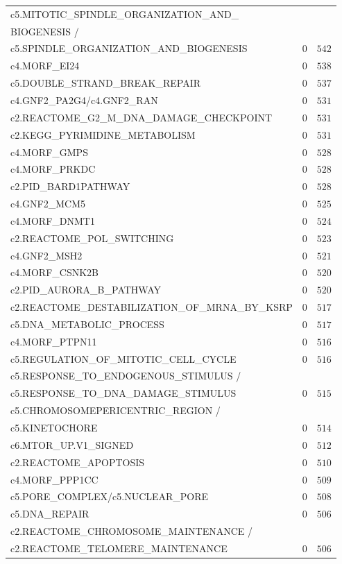 \begin{longtable}[!htbp]{ l r@{.}l }
c5.MITOTIC\_SPINDLE\_ORGANIZATION\_AND\_ \\
\qquad BIOGENESIS / \\
\qquad c5.SPINDLE\_ORGANIZATION\_AND\_BIOGENESIS & $0$ & $542$ \\
c4.MORF\_EI24 & $0$ & $538$ \\
c5.DOUBLE\_STRAND\_BREAK\_REPAIR & $0$ & $537$ \\
c4.GNF2\_PA2G4/c4.GNF2\_RAN & $0$ & $531$ \\
c2.REACTOME\_G2\_M\_DNA\_DAMAGE\_CHECKPOINT & $0$ & $531$ \\
c2.KEGG\_PYRIMIDINE\_METABOLISM & $0$ & $531$ \\
c4.MORF\_GMPS & $0$ & $528$ \\
c4.MORF\_PRKDC & $0$ & $528$ \\
c2.PID\_BARD1PATHWAY & $0$ & $528$ \\
c4.GNF2\_MCM5 & $0$ & $525$ \\
c4.MORF\_DNMT1 & $0$ & $524$ \\
c2.REACTOME\_POL\_SWITCHING & $0$ & $523$ \\
c4.GNF2\_MSH2 & $0$ & $521$ \\
c4.MORF\_CSNK2B & $0$ & $520$ \\
c2.PID\_AURORA\_B\_PATHWAY & $0$ & $520$ \\
c2.REACTOME\_DESTABILIZATION\_OF\_MRNA\_BY\_KSRP & $0$ & $517$ \\
c5.DNA\_METABOLIC\_PROCESS & $0$ & $517$ \\
c4.MORF\_PTPN11 & $0$ & $516$ \\
c5.REGULATION\_OF\_MITOTIC\_CELL\_CYCLE & $0$ & $516$ \\
c5.RESPONSE\_TO\_ENDOGENOUS\_STIMULUS / \\
\qquad c5.RESPONSE\_TO\_DNA\_DAMAGE\_STIMULUS & $0$ & $515$ \\
c5.CHROMOSOMEPERICENTRIC\_REGION / \\
\qquad c5.KINETOCHORE & $0$ & $514$ \\
c6.MTOR\_UP.V1\_SIGNED & $0$ & $512$ \\
c2.REACTOME\_APOPTOSIS & $0$ & $510$ \\
c4.MORF\_PPP1CC & $0$ & $509$ \\
c5.PORE\_COMPLEX/c5.NUCLEAR\_PORE & $0$ & $508$ \\
c5.DNA\_REPAIR & $0$ & $506$ \\
c2.REACTOME\_CHROMOSOME\_MAINTENANCE / \\
\qquad c2.REACTOME\_TELOMERE\_MAINTENANCE & $0$ & $506$ \\

\end{longtable}
